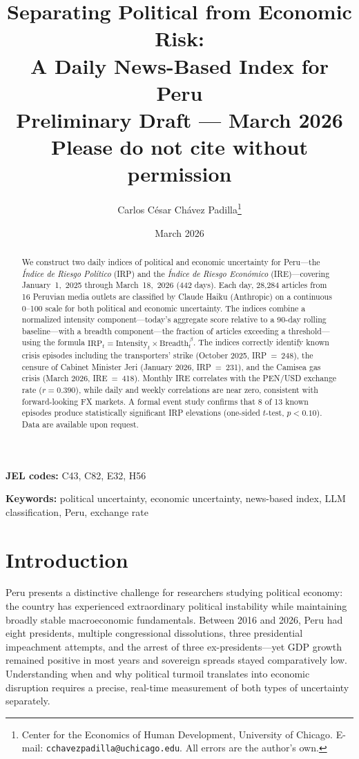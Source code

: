 \documentclass[12pt,a4paper]{article}
\title{%
  \Large\textbf{Separating Political from Economic Risk:\\
  A Daily News-Based Index for Peru}\\[1em]
  \normalsize Preliminary Draft --- March 2026\\
  \normalsize Please do not cite without permission
}
\author{%
  Carlos C\'{e}sar Ch\'{a}vez Padilla\thanks{%
    Center for the Economics of Human Development, University of Chicago.
    E-mail: \texttt{cchavezpadilla@uchicago.edu}.
    All errors are the author's own.}
}
\date{March 2026}
\begin{document}
\maketitle
\thispagestyle{empty}

\begin{abstract}
\noindent
We construct two daily indices of political and economic uncertainty for
Peru---the \emph{\'Indice de Riesgo Pol\'itico} (IRP) and the
\emph{\'Indice de Riesgo Econ\'omico} (IRE)---covering January~1,~2025
through March~18,~2026 (442 days). Each day, 28,284 articles from 16
Peruvian media outlets are classified by Claude Haiku (Anthropic) on a
continuous 0--100 scale for both political and economic uncertainty.  The
indices combine a normalized intensity component---today's aggregate score
relative to a 90-day rolling baseline---with a breadth component---the
fraction of articles exceeding a threshold---using the formula
$\text{IRP}_t = \text{Intensity}_t \times \text{Breadth}_t^{\,\beta}$.
The indices correctly identify known crisis episodes including the
transporters' strike (October 2025, IRP~=~248), the censure of Cabinet
Minister Jeri (January 2026, IRP~=~231), and the Camisea gas crisis
(March 2026, IRE~=~418).  Monthly IRE correlates
with the PEN/USD exchange rate ($r = 0.390$), while daily and weekly
correlations are near zero, consistent with forward-looking FX markets.
A formal event study confirms that 8 of 13 known episodes produce
statistically significant IRP elevations (one-sided $t$-test, $p < 0.10$).
Data are available upon request.
\end{abstract}

\noindent\textbf{JEL codes:} C43, C82, E32, H56

\noindent\textbf{Keywords:} political uncertainty, economic uncertainty, news-based
index, LLM classification, Peru, exchange rate

\newpage

\section{Introduction}
\label{sec:intro}

Peru presents a distinctive challenge for researchers studying political
economy: the country has experienced extraordinary political instability
while maintaining broadly stable macroeconomic fundamentals.  Between 2016
and 2026, Peru had eight presidents, multiple congressional dissolutions,
three presidential impeachment attempts, and the arrest of three
ex-presidents---yet GDP growth remained positive in most years and sovereign
spreads stayed comparatively low.  Understanding when and why political
turmoil translates into economic disruption requires a precise, real-time
measurement of both types of uncertainty separately.
\end{document}
